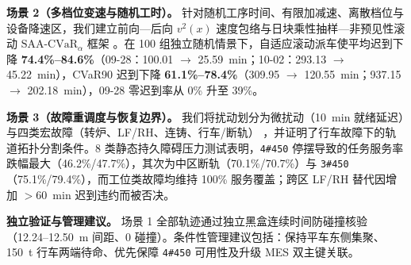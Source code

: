 \documentclass[11pt,a4paper,UTF8]{ctexart}
\begin{document}
{\noindent\textbf{场景 2（多档位变速与随机工时）。}
针对随机工序时间、有限加减速、离散档位与设备降速区，我们建立前向—后向 $v^2(x)$ 速度包络与日块乘性抽样—非预见性滚动 $\text{SAA-CVaR}_\alpha$ 框架 \cite{rockafellar2000optimization}。在 100 组独立随机情景下，自适应滚动派车使平均迟到下降 \textbf{74.4\%--84.6\%}（09-28：100.01 $\rightarrow$ 25.59~min；10-02：293.13 $\rightarrow$ 45.22~min），CVaR90 迟到下降 \textbf{61.1\%--78.4\%}（309.95 $\rightarrow$ 120.55~min；937.15 $\rightarrow$ 202.18~min），09-28 零迟到率从 0\% 升至 39\%。

\noindent\textbf{场景 3（故障重调度与恢复边界）。}
我们将扰动划分为微扰动（10~min 就绪延迟）与四类宏故障（转炉、LF/RH、连铸、行车/断轨） \cite{liu2021ladle}，并证明了行车故障下的轨道拓扑分割条件。8 类静态持久障碍压力测试表明，\texttt{4\#450} 停摆导致的任务服务率跌幅最大（46.2\%/47.7\%），其次为中区断轨（70.1\%/70.7\%）与 \texttt{3\#450}（75.1\%/79.4\%），而工位类故障均维持 100\% 服务覆盖；跨区 LF/RH 替代因增加 $>60$~min 迟到违约而被否决。

\noindent\textbf{独立验证与管理建议。}
场景 1 全部轨迹通过独立黑盒连续时间防碰撞核验（12.24--12.50~m 间距、0 碰撞）。条件性管理建议包括：保持平车东侧集聚、150~t 行车两端待命、优先保障 \texttt{4\#450} 可用性及升级 MES 双主键关联。

\vspace{0.3em}
\begin{table}[H]
\centering
\footnotesize
\caption*{三场景核心指标汇总}
\end{table}
}
\newpage

\tableofcontents
\newpage

\end{document}
